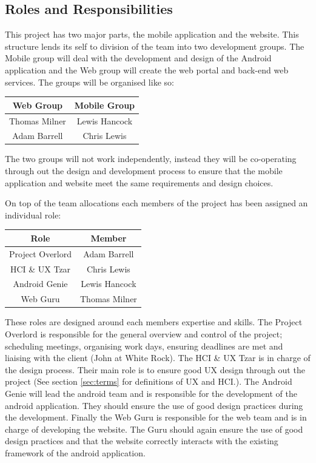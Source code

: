 \documentclass[11pt,a4paper]{article}
\begin{document}
\subsection{Roles and Responsibilities}
This project has two major parts, the mobile application and the website. This structure lends its self to division of the team into two development groups. The Mobile group will deal with the development and design of the Android application and the Web group will create the web portal and back-end web services. The groups will be organised like so:  
\begin{table}[h]
\begin{center}
\begin{tabular}{|c|c|}
\hline
\textbf{Web Group} & \textbf{Mobile Group} \\
\hline
Thomas Milner & Lewis Hancock \\
Adam Barrell & Chris Lewis \\ \hline
\end{tabular}
\end{center}
\end{table}

The two groups will not work independently, instead they will be co-operating through out the design and development process to ensure that the mobile application and website meet the same requirements and design choices. 

On top of the team allocations each members of the project has been assigned an individual role:

\begin{table}[H]
\begin{center}
\begin{tabular}{|c|c|}
\hline
\textbf{Role} & \textbf{Member} \\
\hline
Project Overlord & Adam Barrell  \\\hline
HCI \& UX Tzar & Chris Lewis \\ \hline
Android Genie & Lewis Hancock \\\hline
Web Guru & Thomas Milner \\\hline
\end{tabular}
\end{center}
\end{table}

These roles are designed around each members expertise and skills. The Project Overlord is responsible for the general overview and control of the project; scheduling meetings, organising work days, ensuring deadlines are met and liaising with the client (John at White Rock). The HCI \& UX Tzar is in charge of the design process. Their main role is to ensure good UX design through out the project (See section \ref{sec:terms} for definitions of UX and HCI.). The Android Genie will lead the android team and is responsible for the development of the android application. They should ensure the use of good design practices during the development. Finally the Web Guru is responsible for the web team and is in charge of developing the website. The Guru should again ensure the use of good design practices and that the website correctly interacts with the existing framework of the android application. 
\end{document}
